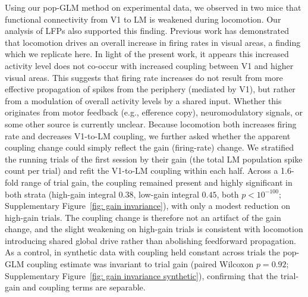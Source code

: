 \documentclass[12pt]{article}
\begin{document}
Using our pop-GLM method on experimental data, we observed in two mice that functional connectivity from V1 to LM is weakened during locomotion. Our analysis of LFPs also supported this finding. Previous work has demonstrated that locomotion drives an overall increase in firing rates in visual areas, a finding which we replicate here. In light of the present work, it appears this increased activity level does not co-occur with increased coupling between V1 and higher visual areas. This suggests that firing rate increases do not result from more effective propagation of spikes from the periphery (mediated by V1), but rather from a modulation of overall activity levels by a shared input. Whether this originates from motor feedback (e.g., efference copy), neuromodulatory signals, or some other source is currently unclear. Because locomotion both increases firing rate and decreases V1-to-LM coupling, we further asked whether the apparent coupling change could simply reflect the gain (firing-rate) change. We stratified the running trials of the first session by their gain (the total LM population spike count per trial) and refit the V1-to-LM coupling within each half. Across a 1.6-fold range of trial gain, the coupling remained present and highly significant in both strata (high-gain integral $0.38$, low-gain integral $0.45$, both $p<10^{-100}$; Supplementary Figure~\ref{fig: gain invariance}), with only a modest reduction on high-gain trials. The coupling change is therefore not an artifact of the gain change, and the slight weakening on high-gain trials is consistent with locomotion introducing shared global drive rather than abolishing feedforward propagation. As a control, in synthetic data with coupling held constant across trials the pop-GLM coupling estimate was invariant to trial gain (paired Wilcoxon $p=0.92$; Supplementary Figure~\ref{fig: gain invariance synthetic}), confirming that the trial-gain and coupling terms are separable.
\end{document}
